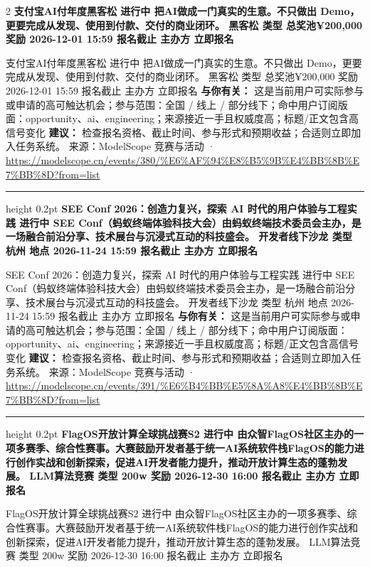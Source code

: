 \documentclass[10.5pt]{ctexart}
\begin{document}
\begin{multicols}{2}
{\large\bfseries 支付宝AI付年度黑客松 进行中 把AI做成一门真实的生意。不只做出 Demo，更要完成从发现、使用到付款、交付的商业闭环。 黑客松 类型 总奖池¥200,000 奖励 2026-12-01 15:59 报名截止 主办方 立即报名}\par
支付宝AI付年度黑客松 进行中 把AI做成一门真实的生意。不只做出 Demo，更要完成从发现、使用到付款、交付的商业闭环。 黑客松 类型 总奖池¥200,000 奖励 2026-12-01 15:59 报名截止 主办方 立即报名
\textbf{与你有关：} 这是当前用户可实际参与或申请的高可触达机会；参与范围：全国 / 线上 / 部分线下；命中用户订阅版面：opportunity、ai、engineering；来源接近一手且权威度高；标题/正文包含高信号变化
\textbf{建议：} 检查报名资格、截止时间、参与形式和预期收益；合适则立即加入任务系统。
{\footnotesize\color{ormuted} 来源：ModelScope 竞赛与活动 · \url{https://modelscope.cn/events/380/%E6%AF%94%E8%B5%9B%E4%BB%8B%E7%BB%8D?from=list}}
\vspace{2mm}
\hrule height 0.2pt
\vspace{2mm}
{\large\bfseries SEE Conf 2026：创造力复兴，探索 AI 时代的用户体验与工程实践 进行中 SEE Conf（蚂蚁终端体验科技大会）由蚂蚁终端技术委员会主办，是一场融合前沿分享、技术展台与沉浸式互动的科技盛会。 开发者线下沙龙 类型 杭州 地点 2026-11-24 15:59 报名截止 主办方 立即报名}\par
SEE Conf 2026：创造力复兴，探索 AI 时代的用户体验与工程实践 进行中 SEE Conf（蚂蚁终端体验科技大会）由蚂蚁终端技术委员会主办，是一场融合前沿分享、技术展台与沉浸式互动的科技盛会。 开发者线下沙龙 类型 杭州 地点 2026-11-24 15:59 报名截止 主办方 立即报名
\textbf{与你有关：} 这是当前用户可实际参与或申请的高可触达机会；参与范围：全国 / 线上 / 部分线下；命中用户订阅版面：opportunity、ai、engineering；来源接近一手且权威度高；标题/正文包含高信号变化
\textbf{建议：} 检查报名资格、截止时间、参与形式和预期收益；合适则立即加入任务系统。
{\footnotesize\color{ormuted} 来源：ModelScope 竞赛与活动 · \url{https://modelscope.cn/events/391/%E6%B4%BB%E5%8A%A8%E4%BB%8B%E7%BB%8D?from=list}}
\vspace{2mm}
\hrule height 0.2pt
\vspace{2mm}
{\large\bfseries FlagOS开放计算全球挑战赛S2 进行中 由众智FlagOS社区主办的一项多赛季、综合性赛事。大赛鼓励开发者基于统一AI系统软件栈FlagOS的能力进行创作实战和创新探索，促进AI开发者能力提升，推动开放计算生态的蓬勃发展。 LLM算法竞赛 类型 200w 奖励 2026-12-30 16:00 报名截止 主办方 立即报名}\par
FlagOS开放计算全球挑战赛S2 进行中 由众智FlagOS社区主办的一项多赛季、综合性赛事。大赛鼓励开发者基于统一AI系统软件栈FlagOS的能力进行创作实战和创新探索，促进AI开发者能力提升，推动开放计算生态的蓬勃发展。 LLM算法竞赛 类型 200w 奖励 2026-12-30 16:00 报名截止 主办方 立即报名

\end{multicols}
\end{document}
